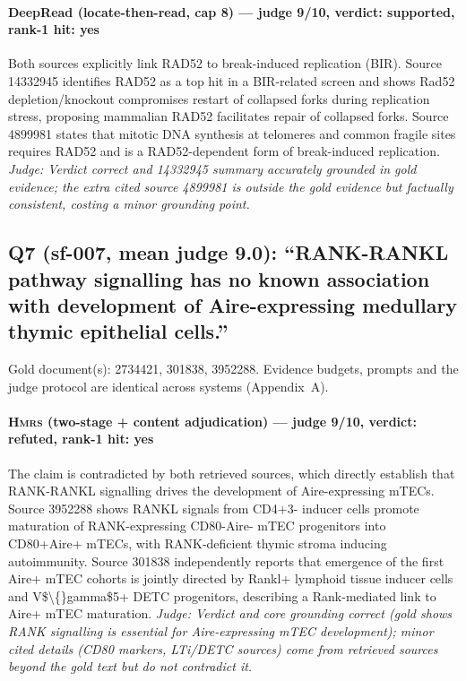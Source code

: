 \documentclass[sigconf, review, anonymous]{acmart}
\begin{document}
\paragraph{DeepRead (locate-then-read, cap 8) --- judge 9/10, verdict: supported, rank-1 hit: yes}
\noindent Both sources explicitly link RAD52 to break-induced replication (BIR). Source 14332945 identifies RAD52 as a top hit in a BIR-related screen and shows Rad52 depletion/knockout compromises restart of collapsed forks during replication stress, proposing mammalian RAD52 facilitates repair of collapsed forks. Source 4899981 states that mitotic DNA synthesis at telomeres and common fragile sites requires RAD52 and is a RAD52-dependent form of break-induced replication.
\noindent\small\textit{Judge: Verdict correct and 14332945 summary accurately grounded in gold evidence; the extra cited source 4899981 is outside the gold evidence but factually consistent, costing a minor grounding point.}

\subsection{Q7 (sf-007, mean judge 9.0): ``RANK-RANKL pathway signalling has no known association with development of Aire-expressing medullary thymic epithelial cells.''}
\label{app:q7}
\noindent Gold document(s): 2734421, 301838, 3952288. Evidence budgets, prompts and the judge protocol are identical across systems (Appendix~A).
\paragraph{\textbf{\textsc{Hmrs}} (two-stage + content adjudication) --- judge 9/10, verdict: refuted, rank-1 hit: yes}
\noindent The claim is contradicted by both retrieved sources, which directly establish that RANK-RANKL signalling drives the development of Aire-expressing mTECs. Source 3952288 shows RANKL signals from CD4+3- inducer cells promote maturation of RANK-expressing CD80-Aire- mTEC progenitors into CD80+Aire+ mTECs, with RANK-deficient thymic stroma inducing autoimmunity. Source 301838 independently reports that emergence of the first Aire+ mTEC cohorts is jointly directed by Rankl+ lymphoid tissue inducer cells and V\$\textbackslash\{\}gamma\$5+ DETC progenitors, describing a Rank-mediated link to Aire+ mTEC maturation.
\noindent\small\textit{Judge: Verdict and core grounding correct (gold shows RANK signalling is essential for Aire-expressing mTEC development); minor cited details (CD80 markers, LTi/DETC sources) come from retrieved sources beyond the gold text but do not contradict it.}
\end{document}
